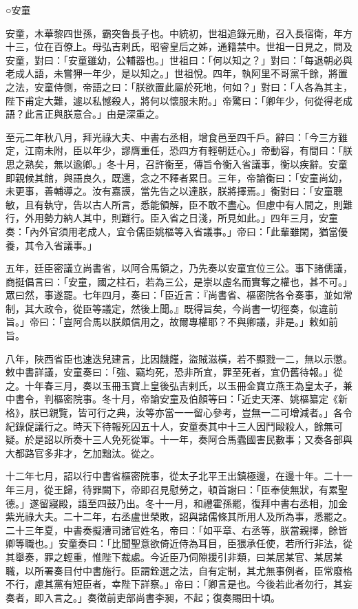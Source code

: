 
\begin{pinyinscope}

 ○安童



 安童，木華黎四世孫，霸突魯長子也。中統初，世祖追錄元勛，召入長宿衛，年方十三，位在百僚上。母弘吉剌氏，昭睿皇后之姊，通籍禁中。世祖一日見之，問及安童，對曰：「安童雖幼，公輔器也。」世祖曰：「何以知之？」對曰：「每退朝必與老成人語，未嘗狎一年少，是以知之。」世祖悅。四年，執阿里不哥黨千餘，將置之法，安童侍側，帝語之曰：「朕欲置此屬於死地，何如？」對曰：「人各為其主，陛下甫定大難，遽以私憾殺人，將何以懷服未附。」帝驚曰：「卿年少，何從得老成語？此言正與朕意合。」由是深重之。



 至元二年秋八月，拜光祿大夫、中書右丞相，增食邑至四千戶。辭曰：「今三方雖定，江南未附，臣以年少，謬膺重任，恐四方有輕朝廷心。」帝動容，有間曰：「朕思之熟矣，無以逾卿。」冬十月，召許衡至，傳旨令衡入省議事，衡以疾辭。安童即親候其館，與語良久，既還，念之不釋者累日。三年，帝諭衡曰：「安童尚幼，未更事，善輔導之。汝有嘉謨，當先告之以達朕，朕將擇焉。」衡對曰：「安童聰敏，且有執守，告以古人所言，悉能領解，臣不敢不盡心。但慮中有人間之，則難行，外用勢力納人其中，則難行。臣入省之日淺，所見如此。」四年三月，安童奏：「內外官須用老成人，宜令儒臣姚樞等入省議事。」帝曰：「此輩雖閑，猶當優養，其令入省議事。」



 五年，廷臣密議立尚書省，以阿合馬領之，乃先奏以安童宜位三公。事下諸儒議，商挺倡言曰：「安童，國之柱石，若為三公，是崇以虛名而實奪之權也，甚不可。」眾曰然，事遂罷。七年四月，奏曰：「臣近言：『尚書省、樞密院各令奏事，並如常制，其大政令，從臣等議定，然後上聞。』既得旨矣，今尚書一切徑奏，似違前旨。」帝曰：「豈阿合馬以朕頗信用之，故爾專權耶？不與卿議，非是。」敕如前旨。



 八年，陜西省臣也速迭兒建言，比因饑饉，盜賊滋橫，若不顯戮一二，無以示懲。敕中書詳議，安童奏曰：「強、竊均死，恐非所宜，罪至死者，宜仍舊待報。」從之。十年春三月，奏以玉冊玉寶上皇後弘吉剌氏，以玉冊金寶立燕王為皇太子，兼中書令，判樞密院事。冬十月，帝諭安童及伯顏等曰：「近史天澤、姚樞纂定《新格》，朕已親覽，皆可行之典，汝等亦當一一留心參考，豈無一二可增減者。」各令紀錄促議行之。時天下待報死囚五十人，安童奏其中十三人因鬥毆殺人，餘無可疑。於是詔以所奏十三人免死從軍。十一年，奏阿合馬蠹國害民數事；又奏各部與大都路官多非才，乞加黜汰。從之。



 十二年七月，詔以行中書省樞密院事，從太子北平王出鎮極邊，在邊十年。二十一年三月，從王歸，待罪闕下，帝即召見慰勞之，頓首謝曰：「臣奉使無狀，有累聖德。」遂留寢殿，語至四鼓乃出。冬十一月，和禮霍孫罷，復拜中書右丞相，加金紫光祿大夫。二十二年，右丞盧世榮敗，詔與諸儒條其所用人及所為事，悉罷之。二十三年夏，中書奏擬漕司諸官姓名，帝曰：「如平章、右丞等，朕當親擇，餘皆卿等職也。」安童奏曰：「比聞聖意欲倚近侍為耳目，臣猥承任使，若所行非法，從其舉奏，罪之輕重，惟陛下裁處。今近臣乃伺隙援引非類，曰某居某官、某居某職，以所署奏目付中書施行。臣謂銓選之法，自有定制，其尤無事例者，臣常廢格不行，慮其黨有短臣者，幸陛下詳察。」帝曰：「卿言是也。今後若此者勿行，其妄奏者，即入言之。」奏徵前吏部尚書李昶，不起；復奏賜田十頃。




\end{pinyinscope}
